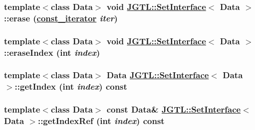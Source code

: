\hypertarget{class_j_g_t_l_1_1_set_interface_63afc2fbaf7a446bcbf5b082aab99a27}{
\subsubsection[erase]{\setlength{\rightskip}{0pt plus 5cm}template$<$class Data$>$ void \hyperlink{class_j_g_t_l_1_1_set_interface}{JGTL::Set\-Interface}$<$ Data $>$::erase (\hyperlink{class_j_g_t_l_1_1_set_interface_1e545e77790db36de24904dc70054225}{const\_\-iterator} {\em iter})}}
\label{class_j_g_t_l_1_1_set_interface_63afc2fbaf7a446bcbf5b082aab99a27}


\hypertarget{class_j_g_t_l_1_1_set_interface_9ac2a0584d9ba0cf45d4591949d72ed6}{
\subsubsection[eraseIndex]{\setlength{\rightskip}{0pt plus 5cm}template$<$class Data$>$ void \hyperlink{class_j_g_t_l_1_1_set_interface}{JGTL::Set\-Interface}$<$ Data $>$::erase\-Index (int {\em index})}}
\label{class_j_g_t_l_1_1_set_interface_9ac2a0584d9ba0cf45d4591949d72ed6}


\hypertarget{class_j_g_t_l_1_1_set_interface_26e49dd3a87be1ec6a5961711e0324be}{
\subsubsection[getIndex]{\setlength{\rightskip}{0pt plus 5cm}template$<$class Data$>$ Data \hyperlink{class_j_g_t_l_1_1_set_interface}{JGTL::Set\-Interface}$<$ Data $>$::get\-Index (int {\em index}) const}}
\label{class_j_g_t_l_1_1_set_interface_26e49dd3a87be1ec6a5961711e0324be}


\hypertarget{class_j_g_t_l_1_1_set_interface_2e19833f67c42d4b83b26ae61f9bfb0c}{
\subsubsection[getIndexRef]{\setlength{\rightskip}{0pt plus 5cm}template$<$class Data$>$ const Data\& \hyperlink{class_j_g_t_l_1_1_set_interface}{JGTL::Set\-Interface}$<$ Data $>$::get\-Index\-Ref (int {\em index}) const}}
\label{class_j_g_t_l_1_1_set_interface_2e19833f67c42d4b83b26ae61f9bfb0c}


